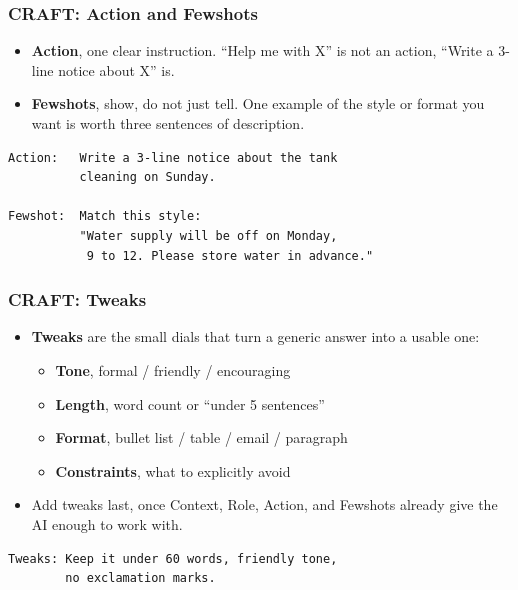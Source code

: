 \begin{frame}[fragile]\frametitle{CRAFT: Action and Fewshots}

\begin{itemize}
    \item \textbf{Action}, one clear instruction. ``Help me with X'' is not an action, ``Write a 3-line notice about X'' is.
    \item \textbf{Fewshots}, show, do not just tell. One example of the style or format you want is worth three sentences of description.
\end{itemize}

\begin{lstlisting}[language=HTML]
Action:   Write a 3-line notice about the tank
          cleaning on Sunday.

Fewshot:  Match this style:
          "Water supply will be off on Monday,
           9 to 12. Please store water in advance."
\end{lstlisting}

\end{frame}

\begin{frame}[fragile]\frametitle{CRAFT: Tweaks}

\begin{itemize}
    \item \textbf{Tweaks} are the small dials that turn a generic answer into a usable one:
    \begin{itemize}
        \item \textbf{Tone}, formal / friendly / encouraging
        \item \textbf{Length}, word count or ``under 5 sentences''
        \item \textbf{Format}, bullet list / table / email / paragraph
        \item \textbf{Constraints}, what to explicitly avoid
    \end{itemize}
    \item Add tweaks last, once Context, Role, Action, and Fewshots already give the AI enough to work with.
\end{itemize}

\begin{lstlisting}[language=HTML]
Tweaks: Keep it under 60 words, friendly tone,
        no exclamation marks.
\end{lstlisting}

\end{frame}


